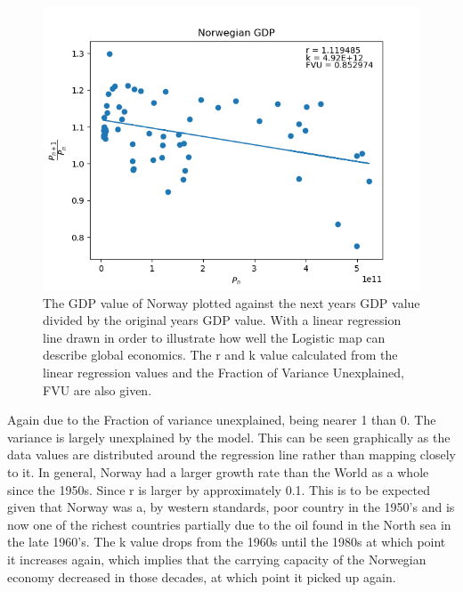 \documentclass[11pt,a4paper]{CLabBookTemplate} %
\begin{document}
\begin{figure}[h!]
	\centering
	\includegraphics[width = 120mm]{Figures/NORGDPScatter.png}
	\caption{The GDP value of Norway plotted against the next years GDP value divided by the original years GDP value. With a linear regression line drawn in order to illustrate how well the Logistic map can describe global economics. The r and k value calculated from the linear regression values and the Fraction of Variance Unexplained, FVU are also given.}
	\label{fig:NORGDPScatter}
\end{figure}

Again due to the Fraction of variance unexplained, being nearer 1 than 0. The variance is largely unexplained by the model. This can be seen graphically as the data values are distributed around the regression line rather than mapping closely to it. 
In general, Norway had a larger growth rate than the World as a whole since the 1950s. Since r is larger by approximately 0.1. This is to be expected given that Norway was a, by western standards, poor country in the 1950's and is now one of the richest countries partially due to the oil found in the North sea in the late 1960's. The k value drops from the 1960s until the 1980s at which point it increases again, which implies that the carrying capacity of the Norwegian economy decreased in those decades, at which point it picked up again. 
\end{document}
